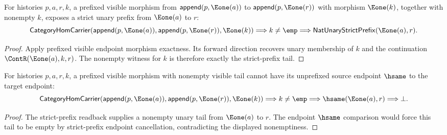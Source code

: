 \begin{theorem}
\label{thm:functor-prefix-e1-visible-morphism-strict-prefix}
For histories $p,a,r,k$, a prefixed visible morphism from
$\mathsf{append}(p,\Eone(a))$ to $\mathsf{append}(p,\Eone(r))$ with morphism
$\Eone(k)$, together with nonempty $k$, exposes a strict unary prefix from
$\Eone(a)$ to $r$:
$$
\mathsf{CategoryHomCarrier}(\mathsf{append}(p,\Eone(a)),
\mathsf{append}(p,\Eone(r)),\Eone(k))
\Longrightarrow
k\neq \emp
\Longrightarrow
\mathsf{NatUnaryStrictPrefix}(\Eone(a),r).
$$
\end{theorem}
\begin{proof}
Apply prefixed visible endpoint morphism exactness. Its forward direction
recovers unary membership of $k$ and the continuation $\ContR(\Eone(a),k,r)$.
The nonempty witness for $k$ is therefore exactly the strict-prefix tail.
\end{proof}

\begin{theorem}
\label{thm:functor-prefix-e1-visible-morphism-endpoint-hsame-absurd}
For histories $p,a,r,k$, a prefixed visible morphism with nonempty visible tail
cannot have its unprefixed source endpoint $\hsame$ to the target endpoint:
$$
\mathsf{CategoryHomCarrier}(\mathsf{append}(p,\Eone(a)),
\mathsf{append}(p,\Eone(r)),\Eone(k))
\Longrightarrow
k\neq \emp
\Longrightarrow
\hsame(\Eone(a),r)
\Longrightarrow
\bot.
$$
\end{theorem}
\begin{proof}
The strict-prefix readback supplies a nonempty unary tail from $\Eone(a)$ to
$r$. The endpoint $\hsame$ comparison would force this tail to be empty by
strict-prefix endpoint cancellation, contradicting the displayed nonemptiness.
\end{proof}

